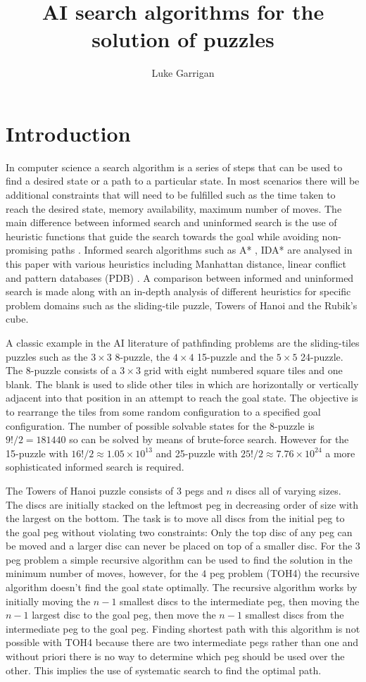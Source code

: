 \documentclass[final]{cmpreport}
\title{AI search algorithms for the solution of puzzles}
\author{Luke Garrigan}
\begin{document}
\section{Introduction}



 In computer science a search algorithm is a series of steps that can be used to find a desired state or a path to a particular state. In most scenarios there will be additional constraints that will need to be fulfilled such as the time taken to reach the desired state, memory availability, maximum number of moves. The main difference between informed search and uninformed search is the use of heuristic functions that guide the search towards the goal while avoiding non-promising paths \cite{felner2015early}. Informed search algorithms such as A* \cite{hart1968formal}, IDA* \cite{korf1985depth} are analysed in this paper with various heuristics including Manhattan distance, linear conflict \cite{hansson1985generating} and pattern databases (PDB) \cite{culberson1996searching}. A comparison between informed and uninformed search is made along with an in-depth analysis of different heuristics for specific problem domains such as the sliding-tile puzzle, Towers of Hanoi and the Rubik's cube.

 A classic example in the AI literature of pathfinding problems are the sliding-tiles puzzles such as the $3\times3$ 8-puzzle, the $4\times4$ 15-puzzle and the $5\times5$ 24-puzzle. The 8-puzzle consists of a $3\times3$ grid with eight numbered square tiles and one blank. The blank is used to slide other tiles in which are horizontally or vertically adjacent into that position in an attempt to reach the goal state. The objective is to rearrange the tiles from some random configuration to a specified goal configuration. The number of possible solvable states for the 8-puzzle is $9!/2=181440$ so can be solved by means of brute-force search. However for the 15-puzzle with $16!/2\approx1.05\times10^{13}$ and 25-puzzle with $25!/2\approx7.76\times10^{24}$ a more sophisticated informed search is required.
 
 The Towers of Hanoi puzzle consists of $3$ pegs and $n$ discs all of varying sizes. The discs are initially stacked on the leftmost peg in decreasing order of size with the largest on the bottom. The task is to move all discs from the initial peg to the goal peg without violating two constraints: Only the top disc of any peg can be moved and a larger disc can never be placed on top of a smaller disc. For the $3$ peg problem a simple recursive algorithm can be used to find the solution in the minimum number of moves, however, for the $4$ peg problem (TOH4) the recursive algorithm doesn't find the goal state optimally. The recursive algorithm works by initially moving the $n-1$ smallest discs to the intermediate peg, then moving the $n-1$ largest disc to the goal peg, then move the $n-1$ smallest discs from the intermediate peg to the goal peg. Finding shortest path with this algorithm is not possible with TOH4 because there are two intermediate pegs rather than one and without priori there is no way to determine which peg should be used over the other. This implies the use of systematic search to find the optimal path.
 
\end{document}
